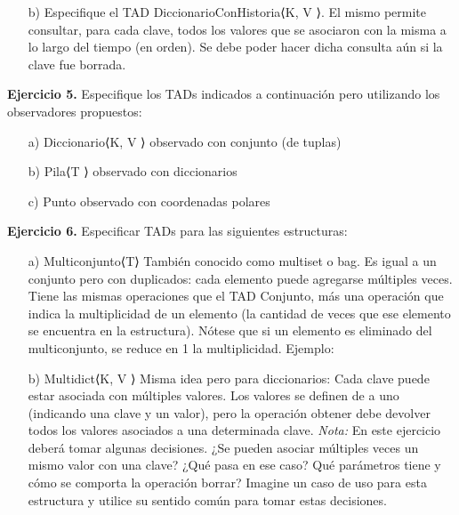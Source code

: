 \documentclass{article}
\newenvironment{tad}[1]{
	\paragraph{} \vspace*{-4mm}
	\newcommand{\obs}[2]{\texttt{obs} ##1 : ##2}

	\vspace{1ex}
	\texttt{TAD} \textit{#1} $\{$
	\par
	\tocarEspacios
}
{

\hspace{2.5mm} $\}$
\vspace{2ex}
}
\begin{document}
\begin{itemize}
\begin{tad}{Diccionario$\langle$K, V$\rangle$}
        \begin{proc}{borrar}{\Inout d: Diccionario$\langle$K, V$\rangle$, \In k: K}{}
            \end{proc}
        
    \end{tad}

    \item [b)] Especifique el TAD DiccionarioConHistoria⟨K, V ⟩. El mismo permite consultar, para cada clave, todos los valores que se
    asociaron con la misma a lo largo del tiempo (en orden). Se debe poder hacer dicha consulta a\'un si la clave fue borrada.
\end{itemize}

\textbf{Ejercicio 5.} Especifique los TADs indicados a continuaci\'on pero utilizando los observadores propuestos:
\begin{itemize}
    \item [a)] Diccionario⟨K, V ⟩ observado con conjunto (de tuplas)
    \item [b)] Pila⟨T ⟩ observado con diccionarios
    \item [c)] Punto observado con coordenadas polares
\end{itemize}

\textbf{Ejercicio 6.} Especificar TADs para las siguientes estructuras:
\begin{itemize}
    \item [a)] Multiconjunto⟨T⟩
    Tambi\'en conocido como multiset o bag. Es igual a un conjunto pero con duplicados: cada elemento puede agregarse
    m\'ultiples veces. Tiene las mismas operaciones que el TAD Conjunto, m\'as una operaci\'on que indica la multiplicidad de
    un elemento (la cantidad de veces que ese elemento se encuentra en la estructura). N\'otese que si un elemento es eliminado
    del multiconjunto, se reduce en 1 la multiplicidad. Ejemplo:
    \item [b)] Multidict⟨K, V ⟩
    Misma idea pero para diccionarios: Cada clave puede estar asociada con m\'ultiples valores. Los valores se definen de a uno
    (indicando una clave y un valor), pero la operaci\'on obtener debe devolver todos los valores asociados a una determinada
    clave.
    \textit{Nota:} En este ejercicio deber\'a tomar algunas decisiones. ¿Se pueden asociar m\'ultiples veces un mismo valor con una clave? ¿Qu\'e pasa en ese caso? Qu\'e par\'ametros tiene y c\'omo se comporta la operaci\'on borrar? Imagine un caso de uso para esta estructura y utilice su sentido com\'un para tomar estas decisiones.
\end{itemize}
\end{document}
